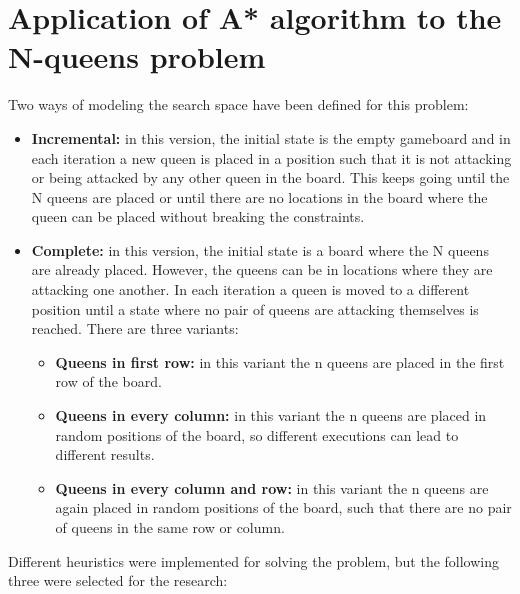 \documentclass[]{llncs}
\begin{document}
\section{Application of A* algorithm to the N-queens problem}\label{astar_nqueens}
Two ways of modeling the search space have been defined for this problem:
\begin{itemize}
    \item \textbf{Incremental:} in this version, the initial state is the empty gameboard and in each iteration a new queen is placed in a position such that it is not attacking or being attacked by any other queen in the board. This keeps going until the N queens are placed or until there are no locations in the board where the queen can be placed without breaking the constraints.
    \item \textbf{Complete:} in this version, the initial state is a board where the N queens are already placed. However, the queens can be in locations where they are attacking one another. In each iteration a queen is moved to a different position until a state where no pair of queens are attacking themselves is reached. There are three variants:
        \begin{itemize}
            \item \textbf{Queens in first row:} in this variant the n queens are placed in the first row of the board.
            \item \textbf{Queens in every column:} in this variant the n queens are placed in random positions of the board, so different executions can lead to different results.
            \item \textbf{Queens in every column and row:} in this variant the n queens are again placed in random positions of the board, such that there are no pair of queens in the same row or column.
        \end{itemize}
\end{itemize}
Different heuristics were implemented for solving the problem, but the following three were selected for the research:
\end{document}
